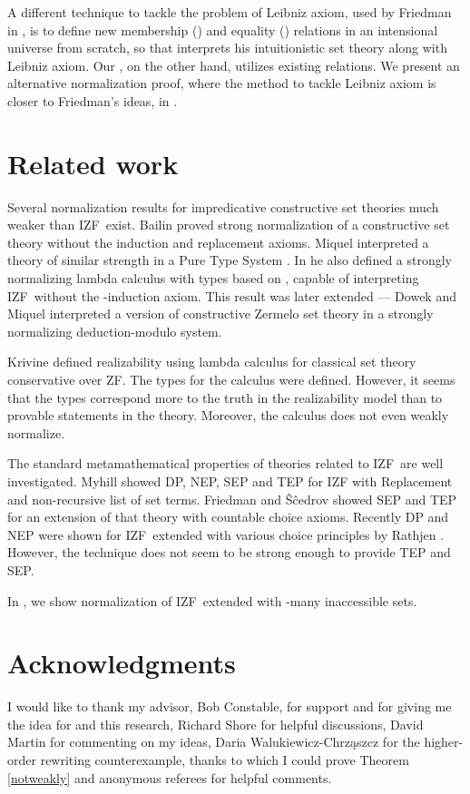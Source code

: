 \documentclass{LMCS}
\newcommand{\izfc}{IZF}
\newcommand{\izfr}{IZF}
\begin{document}
A different technique to tackle the problem of Leibniz axiom, used by Friedman in \cite{friedmancons}, 
is to define new membership () and equality () relations in an intensional universe from scratch, so that  interprets his intuitionistic set theory along with 
Leibniz axiom. Our , on the other hand, utilizes existing  relations.
We present an alternative normalization proof, where the method to
tackle Leibniz axiom is closer to Friedman's ideas, in \cite{jatrinac2006}.

\section{Related work}\label{others}

Several normalization results for impredicative constructive set theories
much weaker than \izfr\ exist. Bailin
\cite{bailin88} proved  strong normalization of a constructive set theory
without the induction and replacement axioms. Miquel 
interpreted a theory of similar strength in a Pure Type System
\cite{miquelpts}. In \cite{miquel} he also defined a strongly normalizing
lambda calculus with types based on ,
capable of interpreting \izfc\ without the -induction axiom. This result was
later extended --- Dowek and Miquel \cite{dowek} interpreted a version of constructive
Zermelo set theory in a strongly normalizing deduction-modulo system.

Krivine \cite{krivine} defined realizability using lambda calculus for classical set theory conservative
over ZF. The types for the calculus were defined. However, it seems that the types
correspond more to the truth in the realizability model than to provable
statements in the theory. Moreover, the calculus does not even weakly normalize.

The standard metamathematical properties of theories related to \izfr\ are well investigated.
Myhill \cite{myhill72} showed DP, NEP, SEP and TEP for IZF with Replacement and
non-recursive list of set terms. Friedman and \^S\^cedrov \cite{frsce1} showed SEP and
TEP for an extension of that theory with countable choice
axioms. Recently DP and NEP were shown for \izfc\ extended with various choice principles by Rathjen \cite{rathjenizf}.
However, the technique does not seem to be strong enough to provide TEP and SEP.

In \cite{jatrinac2006}, we show normalization of \izfr\ extended with
-many inaccessible sets.

\section*{Acknowledgments}

I would like to thank my advisor, Bob Constable, for support and for
giving me the idea for  and this research, Richard Shore for
helpful discussions, David Martin for commenting on my ideas, Daria
Walukiewicz-Chrz{\selectfont\k a}szcz for the
higher-order rewriting counterexample, thanks to which I could prove
Theorem \ref{notweakly} and anonymous referees for helpful comments.
 
\end{document}
